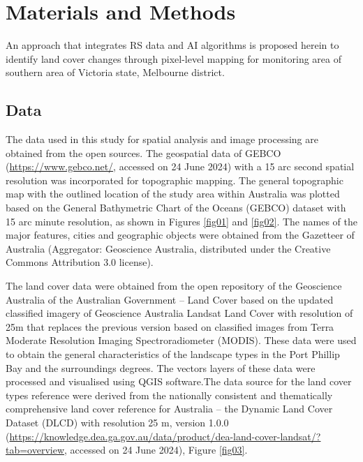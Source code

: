 \documentclass[jmse,article,submit,pdftex,moreauthors]{Definitions/mdpi}
\begin{document}
\section{Materials and Methods}

An approach that integrates RS data and AI algorithms is proposed herein to identify land cover changes through pixel-level mapping for monitoring area of southern area of Victoria state, Melbourne district. 

\subsection{Data}

The data used in this study for spatial analysis and image processing are obtained from the open sources. The geospatial data of GEBCO (\href{https://www.gebco.net/}{https://www.gebco.net/}, accessed on 24 June 2024) with a 15 arc second spatial resolution was incorporated for topographic mapping. The general topographic map with the outlined location of the study area within Australia was plotted based on the General Bathymetric Chart of the Oceans (GEBCO) dataset with 15 arc minute resolution, as shown in Figures \ref{fig01} and \ref{fig02}. The names of the major features, cities and geographic objects were obtained from the Gazetteer of Australia (Aggregator: Geoscience Australia, distributed under the Creative Commons Attribution 3.0 license). 

The land cover data were obtained from the open repository of the Geoscience Australia of the Australian Government -- Land Cover based on the updated classified imagery of Geoscience Australia Landsat Land Cover with resolution of 25m that replaces the previous version based on classified images from Terra Moderate Resolution Imaging Spectroradiometer (MODIS). These data were used to obtain the general characteristics of the landscape types in the Port Phillip Bay and the surroundings degrees. The vectors layers of these data were processed and visualised using QGIS software.The data source for the land cover types reference were derived from the nationally consistent and thematically comprehensive land cover reference for Australia -- the Dynamic Land Cover Dataset (DLCD) with resolution 25 m, version 1.0.0 (\href{https://knowledge.dea.ga.gov.au/data/product/dea-land-cover-landsat/?tab=overview}{https://knowledge.dea.ga.gov.au/data/product/dea-land-cover-landsat/?tab=overview}, accessed on 24 June 2024), Figure \ref{fig03}. 
\end{document}
